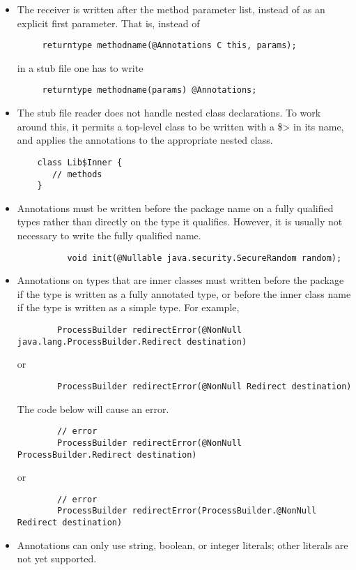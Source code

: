\begin{itemize}

\item
  The receiver is written after the method parameter list, instead of as an
  explicit first parameter.  That is, instead of

\begin{Verbatim}
     returntype methodname(@Annotations C this, params);
\end{Verbatim}

\noindent
in a stub file one has to write

\begin{Verbatim}
     returntype methodname(params) @Annotations;
\end{Verbatim}

\item
  The stub file reader
  does not handle nested class declarations.  To work around this, it permits a
  top-level class to be written with a \<\$> in its name, and applies the
  annotations to the appropriate nested class.

\begin{Verbatim}
    class Lib$Inner {
       // methods
    }
\end{Verbatim}

\item
  Annotations must be written before the package name on a fully qualified
  types rather than directly on the type it qualifies.  However, it is usually not
  necessary to write the fully qualified name.

  \begin{Verbatim}
          void init(@Nullable java.security.SecureRandom random);
   \end{Verbatim}
\item
   Annotations on types that are inner classes must written before the
   package if the type is written as a
   fully annotated type, or before the inner class name if the type is
   written as a simple type. For example,

\begin{Verbatim}
        ProcessBuilder redirectError(@NonNull java.lang.ProcessBuilder.Redirect destination)
\end{Verbatim}
 or
\begin{Verbatim}
        ProcessBuilder redirectError(@NonNull Redirect destination)
\end{Verbatim}
   The code below will cause an error.
\begin{Verbatim}
        // error
        ProcessBuilder redirectError(@NonNull ProcessBuilder.Redirect destination)
\end{Verbatim}
 or
\begin{Verbatim}
        // error
        ProcessBuilder redirectError(ProcessBuilder.@NonNull Redirect destination)
\end{Verbatim}

\item
  Annotations can only use string, boolean, or integer literals; other literals are not
  yet supported.
\end{itemize}

